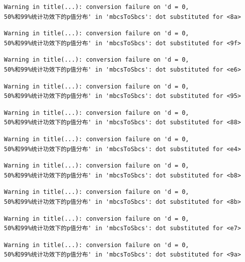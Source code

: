 \documentclass[
  letterpaper,
  DIV=11,
  numbers=noendperiod]{scrreprt}
\begin{document}
\begin{verbatim}
Warning in title(...): conversion failure on 'd = 0,
50%和99%统计功效下的p值分布' in 'mbcsToSbcs': dot substituted for <8a>
\end{verbatim}

\begin{verbatim}
Warning in title(...): conversion failure on 'd = 0,
50%和99%统计功效下的p值分布' in 'mbcsToSbcs': dot substituted for <9f>
\end{verbatim}

\begin{verbatim}
Warning in title(...): conversion failure on 'd = 0,
50%和99%统计功效下的p值分布' in 'mbcsToSbcs': dot substituted for <e6>
\end{verbatim}

\begin{verbatim}
Warning in title(...): conversion failure on 'd = 0,
50%和99%统计功效下的p值分布' in 'mbcsToSbcs': dot substituted for <95>
\end{verbatim}

\begin{verbatim}
Warning in title(...): conversion failure on 'd = 0,
50%和99%统计功效下的p值分布' in 'mbcsToSbcs': dot substituted for <88>
\end{verbatim}

\begin{verbatim}
Warning in title(...): conversion failure on 'd = 0,
50%和99%统计功效下的p值分布' in 'mbcsToSbcs': dot substituted for <e4>
\end{verbatim}

\begin{verbatim}
Warning in title(...): conversion failure on 'd = 0,
50%和99%统计功效下的p值分布' in 'mbcsToSbcs': dot substituted for <b8>
\end{verbatim}

\begin{verbatim}
Warning in title(...): conversion failure on 'd = 0,
50%和99%统计功效下的p值分布' in 'mbcsToSbcs': dot substituted for <8b>
\end{verbatim}

\begin{verbatim}
Warning in title(...): conversion failure on 'd = 0,
50%和99%统计功效下的p值分布' in 'mbcsToSbcs': dot substituted for <e7>
\end{verbatim}

\begin{verbatim}
Warning in title(...): conversion failure on 'd = 0,
50%和99%统计功效下的p值分布' in 'mbcsToSbcs': dot substituted for <9a>
\end{verbatim}
\end{document}
